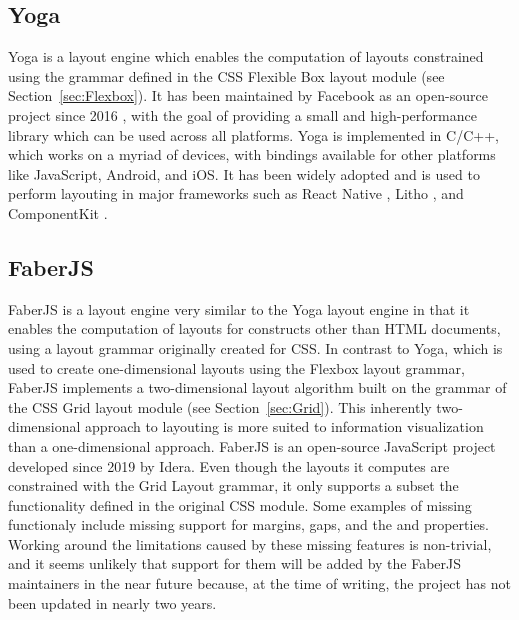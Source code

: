 \subsection{Yoga}
\label{sec:Yoga}

Yoga \parencite{Yoga} is a layout engine which enables the computation
of layouts constrained using the grammar defined in the CSS Flexible
Box layout module (see Section~\ref{sec:Flexbox}). It has been
maintained by Facebook as an open-source project since 2016
\parencite{YogaRelease}, with the goal of providing a small and
high-performance library which can be used across all platforms. Yoga
is implemented in C/C++, which works on a myriad of devices, with
bindings available for other platforms like JavaScript, Android, and
iOS. It has been widely adopted and is used to perform layouting in
major frameworks such as React Native \parencite{ReactNative}, Litho
\parencite{Litho}, and ComponentKit \parencite{ComponentKit}.



\subsection{FaberJS}
\label{sec:FaberJS}

FaberJS \parencite{FaberJS} is a layout engine very similar to the
Yoga layout engine in that it enables the computation of layouts for
constructs other than HTML documents, using a layout grammar
originally created for CSS. In contrast to Yoga, which is used to
create one-dimensional layouts using the Flexbox layout grammar,
FaberJS implements a two-dimensional layout algorithm built on the
grammar of the CSS Grid layout module (see Section~\ref{sec:Grid}).
This inherently two-dimensional approach to layouting is more suited
to information visualization than a one-dimensional approach. FaberJS
is an open-source JavaScript project developed since 2019 by
Idera. Even though the layouts it computes are constrained with the
Grid Layout grammar, it only supports a subset the functionality
defined in the original CSS module. Some examples of missing
functionaly include missing support for margins, gaps, and the
 and  properties. Working
around the limitations caused by these missing features is
non-trivial, and it seems unlikely that support for them will be added
by the FaberJS maintainers in the near future because, at the time of
writing, the project has not been updated in nearly two years.







